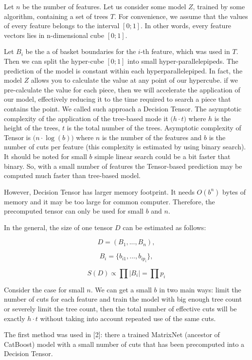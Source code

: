 \documentclass[a4paper]{jpconf}
\begin{document}
Let $n$ be the number of features. Let us consider some model $Z$, trained by some algorithm, containing a set of trees $T$. For convenience, we assume that the values of every feature belongs to the interval $[0;1]$. In other words, every feature vectors lies in n-dimensional cube $[0;1]$.

Let $B_i$ be the a of basket boundaries for the $i$-th feature, which was used in $T$. Then we can split the hyper-cube $[0;1]$ into small hyper-parallelepipeds. The prediction of the model is constant within each hyperparallelepiped. In fact, the model $Z$ allows you to calculate the value at any point of our hypercube. if we pre-calculate the value for each piece, then we will accelerate the application of our model, effectively reducing it to the time required to search a piece that contains the point. We called such approach a Decision Tensor. The asymptotic complexity of the application of the tree-based mode it $\mathcal(h\cdot t)$ where $h$ is the height of the trees, $t$ is the total number of the trees. Asymptotic complexity of Tensor is $\mathcal(n\cdot \log(b))$ where $n$ is the number of the features and $b$ is the number of cuts per feature (this complexity is estimated by using binary search). It should be noted for small $b$ simple linear search could be a bit faster that binary. So, with a small number of features the Tensor-based prediction may be computed much faster than tree-based model.

However, Decision Tensor has larger memory footprint. It needs $O(b^n)$ bytes of memory and it may be too large for common computer. Therefore, the precomputed tensor can only be used for small $b$ and $n$.

In the general, the size of one tensor $D$ can be estimated as follows:

$$D = (B_{1}, ..., B_{n}),$$

$$B_{i} = \{b_{i1}, ..., b_{ip_{i}}\},$$

$$S(D) \propto \prod |B_{i}| = \prod p_i$$

Consider the case for small $n$. We can get a small $b$ in two main ways: limit the number of cuts for each feature and train the model with big enough tree count or severely limit the tree count, then the total number of effective cuts will be exactly $h\cdot t$ without taking into account repeated use of the same cuts.

The first method was used in [2]: there a trained MatrixNet (ancestor of CatBoost) model with a small number of cuts that has been precomputed into a Decision Tensor.
\end{document}
